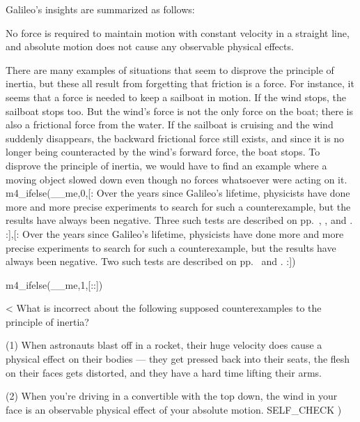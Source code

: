 Galileo's insights are summarized as follows:

\begin{important}\label{principle-of-inertia}
No force is required to maintain motion with constant velocity in
a straight line, and absolute motion does not cause any
observable physical effects.
\end{important}

There are many examples of situations that seem to disprove
the principle of inertia, but these all result from
forgetting that friction is a force. For instance, it seems
that a force is needed to keep a sailboat in motion. If the
wind stops, the sailboat stops too. But the wind's force is
not the only force on the boat; there is also a frictional
force from the water. If the sailboat is cruising and the
wind suddenly disappears, the backward frictional force
still exists, and since it is no longer being counteracted
by the wind's forward force, the boat stops. To disprove the
principle of inertia, we would have to find an example where
a moving object slowed down even though no forces whatsoever were acting on it.
m4_ifelse(__me,0,[:%
Over the years since Galileo's lifetime, physicists have done more and more precise
experiments to search for such a counterexample, but the results have always been negative.
Three such tests are described on pp.~\pageref{sec:galileo-ramps-inertia},
\pageref{eg:clock-comparison-inertia}, and \pageref{sec:battat}.\label{first-law-evidence}
:],[:%
Over the years since Galileo's lifetime, physicists have done more and more precise
experiments to search for such a counterexample, but the results have always been negative.
Two such tests are described on pp.~\pageref{battat} 
and \pageref{eg:clock-comparison-inertia}.\label{first-law-evidence}
:])

m4_ifelse(__me,1,[:\enlargethispage{\baselineskip}:])

<%
What is incorrect about the following supposed counterexamples
to the principle of inertia?

(1) When astronauts blast off in a rocket, their huge
velocity does cause a physical effect on their bodies ---
they get pressed back into their seats, the flesh on their
faces gets distorted, and they have a hard time lifting their arms.

(2) When you're driving in a convertible with the top down,
the wind in your face is an observable physical effect of
your absolute motion.
  SELF_CHECK
  ) %


